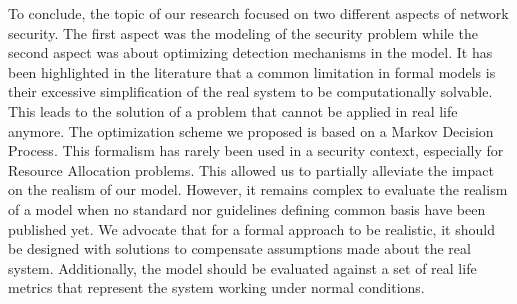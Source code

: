 To conclude, the topic of our research focused on two different aspects of network security.
The first aspect was the modeling of the security problem while the second aspect was about optimizing detection mechanisms in the model. It has been highlighted in the literature that a common limitation in formal models is their excessive simplification of the real system to be computationally solvable. This leads to the solution of a problem that cannot be applied in real life anymore. The optimization scheme we proposed is based on a Markov Decision Process. This formalism has rarely been used in a security context, especially for Resource Allocation problems. 
This allowed us to partially alleviate the impact on the realism of our model. However, it remains complex to evaluate the realism of a model when no standard nor guidelines defining common basis have been published yet. We advocate that for a formal approach to be realistic, it should be designed with solutions to compensate assumptions made about the real system. Additionally, the model should be evaluated against a set of real life metrics that represent the system working under normal conditions.

